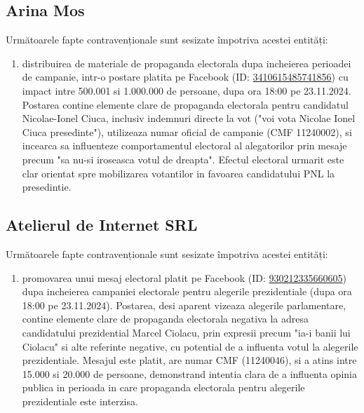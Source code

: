 \documentclass[a4paper,12pt]{article}
\begin{document}
\vspace{0.5cm}

\subsection{Arina Mos}
Următoarele fapte contravenționale sunt sesizate împotriva acestei entități:

\begin{enumerate}[leftmargin=*, label=\arabic*.)]
    \item distribuirea de materiale de propaganda electorala dupa incheierea perioadei de campanie, intr-o postare platita pe Facebook (ID: \href{https://www.facebook.com/ads/library/?id=3410615485741856}{3410615485741856}) cu impact intre 500.001 si 1.000.000 de persoane, dupa ora 18:00 pe 23.11.2024. Postarea contine elemente clare de propaganda electorala pentru candidatul Nicolae-Ionel Ciuca, inclusiv indemnuri directe la vot ("voi vota Nicolae Ionel Ciuca presedinte"), utilizeaza numar oficial de campanie (CMF 11240002), si incearca sa influenteze comportamentul electoral al alegatorilor prin mesaje precum "sa nu-si iroseasca votul de dreapta". Efectul electoral urmarit este clar orientat spre mobilizarea votantilor in favoarea candidatului PNL la presedintie.
\end{enumerate}

\vspace{0.5cm}

\subsection{Atelierul de Internet SRL}
Următoarele fapte contravenționale sunt sesizate împotriva acestei entități:

\begin{enumerate}[leftmargin=*, label=\arabic*.)]
    \item promovarea unui mesaj electoral platit pe Facebook (ID: \href{https://www.facebook.com/ads/library/?id=930212335660605}{930212335660605}) dupa incheierea campaniei electorale pentru alegerile prezidentiale (dupa ora 18:00 pe 23.11.2024). Postarea, desi aparent vizeaza alegerile parlamentare, contine elemente clare de propaganda electorala negativa la adresa candidatului prezidential Marcel Ciolacu, prin expresii precum "ia-i banii lui Ciolacu" si alte referinte negative, cu potential de a influenta votul la alegerile prezidentiale. Mesajul este platit, are numar CMF (11240046), si a atins intre 15.000 si 20.000 de persoane, demonstrand intentia clara de a influenta opinia publica in perioada in care propaganda electorala pentru alegerile prezidentiale este interzisa.
\end{enumerate}
\end{document}

